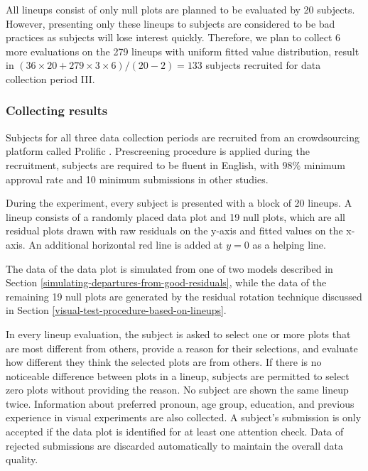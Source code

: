 \documentclass[]{interact}
\theoremstyle{plain}%
\theoremstyle{definition}
\theoremstyle{remark}
\begin{document}
All lineups consist of only null plots are planned to be evaluated by 20
subjects. However, presenting only these lineups to subjects are
considered to be bad practices as subjects will lose interest quickly.
Therefore, we plan to collect 6 more evaluations on the 279 lineups with
uniform fitted value distribution, result in
\((36 \times 20 + 279 \times 3 \times 6) / (20-2) = 133\) subjects
recruited for data collection period III.

\hypertarget{collecting-results}{%
\subsubsection{Collecting results}\label{collecting-results}}

Subjects for all three data collection periods are recruited from an
crowdsourcing platform called Prolific \citep{palan2018prolific}.
Prescreening procedure is applied during the recruitment, subjects are
required to be fluent in English, with \(98\%\) minimum approval rate
and 10 minimum submissions in other studies.

During the experiment, every subject is presented with a block of 20
lineups. A lineup consists of a randomly placed data plot and 19 null
plots, which are all residual plots drawn with raw residuals on the
y-axis and fitted values on the x-axis. An additional horizontal red
line is added at \(y = 0\) as a helping line.

The data of the data plot is simulated from one of two models described
in Section \ref{simulating-departures-from-good-residuals}, while the
data of the remaining 19 null plots are generated by the residual
rotation technique discussed in Section
\ref{visual-test-procedure-based-on-lineups}.

In every lineup evaluation, the subject is asked to select one or more
plots that are most different from others, provide a reason for their
selections, and evaluate how different they think the selected plots are
from others. If there is no noticeable difference between plots in a
lineup, subjects are permitted to select zero plots without providing
the reason. No subject are shown the same lineup twice. Information
about preferred pronoun, age group, education, and previous experience
in visual experiments are also collected. A subject's submission is only
accepted if the data plot is identified for at least one attention
check. Data of rejected submissions are discarded automatically to
maintain the overall data quality.
\end{document}
